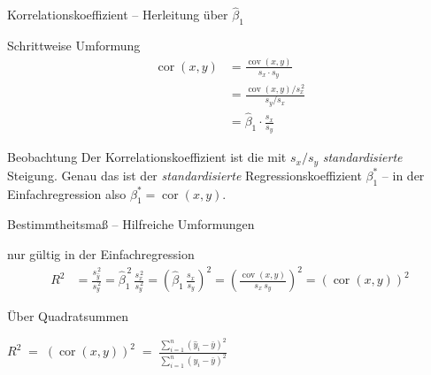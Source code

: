\documentclass[aspectratio=169,11pt]{beamer}
\begin{document}
\begin{frame}{Korrelationskoeffizient -- Herleitung über $\hat{\beta}_1$}
  \begin{block}{Schrittweise Umformung}
    \begin{align*}
      \operatorname{cor}(x,y)
        &= \frac{\operatorname{cov}(x,y)}{s_x \cdot s_y} \\[0.4em]
        &= \frac{\operatorname{cov}(x,y)/s_x^{\,2}}{s_y/s_x} \\[0.4em]
        &= \hat{\beta}_1 \cdot \frac{s_x}{s_y}
    \end{align*}
  \end{block}

  \begin{exampleblock}{Beobachtung}
    Der Korrelations\-koeffizient ist die mit
    $s_x/s_y$ \emph{standardisierte} Steigung. Genau das ist der
    \emph{standardisierte} Regressionskoeffizient
    $\beta_1^{\ast}$ -- in der Einfachregression also
    $\beta_1^{\ast} = \operatorname{cor}(x,y)$.
  \end{exampleblock}
\end{frame}

\begin{frame}{Bestimmtheitsmaß -- Hilfreiche Umformungen}
  \begin{alertblock}{nur gültig in der Einfachregression}
    \begin{align*}
      R^{2}
        &= \frac{s_{\hat{y}}^{\,2}}{s_y^{\,2}}
        = \hat{\beta}_1^{\,2}\,\frac{s_x^{\,2}}{s_y^{\,2}}
        = \!\left(\hat{\beta}_1\,\frac{s_x}{s_y}\right)^{\!2}
        = \!\left(\frac{\operatorname{cov}(x,y)}{s_x\,s_y}\right)^{\!2}
        = (\operatorname{cor}(x,y))^{2}
    \end{align*}
  \end{alertblock}

  \begin{block}{Über Quadratsummen}
    \begin{center}
      $\displaystyle
        R^{2} \;=\; (\operatorname{cor}(x,y))^{2}
        \;=\; \frac{\sum_{i=1}^{n}(\hat{y}_i - \bar{y})^{2}}
                   {\sum_{i=1}^{n}(y_i - \bar{y})^{2}}$
    \end{center}
  \end{block}
\end{frame}
\end{document}
